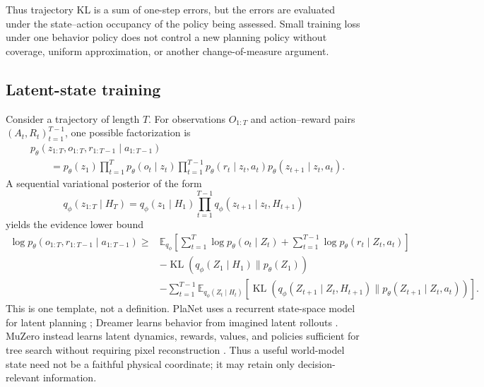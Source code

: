 \documentclass[11pt]{amsart}
\numberwithin{equation}{section}
\theoremstyle{definition}
\theoremstyle{plain}
\theoremstyle{remark}
\newcommand{\E}{\mathbb{E}}
\DeclareMathOperator{\KL}{KL}
\begin{document}
Thus trajectory KL is a sum of one-step errors, but the errors are evaluated
under the state--action occupancy of the policy being assessed.  Small
training loss under one behavior policy does not control a new planning policy
without coverage, uniform approximation, or another change-of-measure
argument.

\subsection{Latent-state training}

Consider a trajectory of length $T$.  For observations $O_{1:T}$ and
action--reward pairs $(A_t,R_t)_{t=1}^{T-1}$, one possible factorization is
\begin{equation}\label{eq:world-generative-factorization}
\begin{aligned}
&p_\theta(z_{1:T},o_{1:T},r_{1:T-1}\mid a_{1:T-1})\\
&\qquad={}
 p_\theta(z_1)
 \prod_{t=1}^T p_\theta(o_t\mid z_t)
 \prod_{t=1}^{T-1}
 p_\theta(r_t\mid z_t,a_t)
 p_\theta(z_{t+1}\mid z_t,a_t).
\end{aligned}
\end{equation}
A sequential variational posterior of the form
\begin{equation}\label{eq:world-variational-posterior}
 q_\phi(z_{1:T}\mid H_T)
 =q_\phi(z_1\mid H_1)
  \prod_{t=1}^{T-1}
  q_\phi(z_{t+1}\mid z_t,H_{t+1})
\end{equation}
yields the evidence lower bound
\begin{equation}\label{eq:world-elbo}
\begin{aligned}
 \log p_\theta(o_{1:T},r_{1:T-1}\mid a_{1:T-1})
 \ge{}&
 \E_{q_\phi}\!\left[
   \sum_{t=1}^T\log p_\theta(o_t\mid Z_t)
   +\sum_{t=1}^{T-1}\log p_\theta(r_t\mid Z_t,a_t)
 \right]\\
 &-\KL(q_\phi(Z_1\mid H_1)\|p_\theta(Z_1))\\
 &-\sum_{t=1}^{T-1}
   \E_{q_\phi(Z_t\mid H_t)}\!\left[
     \KL\!\left(
       q_\phi(Z_{t+1}\mid Z_t,H_{t+1})
       \|p_\theta(Z_{t+1}\mid Z_t,a_t)
     \right)
   \right].
\end{aligned}
\end{equation}
This is one template, not a definition.  PlaNet uses a recurrent state-space
model for latent planning \cite{HafnerEtAl2019Planet}; Dreamer learns behavior
from imagined latent rollouts \cite{HafnerEtAl2020Dreamer}.  MuZero instead
learns latent dynamics, rewards, values, and policies sufficient for tree
search without requiring pixel reconstruction \cite{SchrittwieserEtAl2020}.
Thus a useful world-model state need not be a faithful physical coordinate; it
may retain only decision-relevant information.
\end{document}
